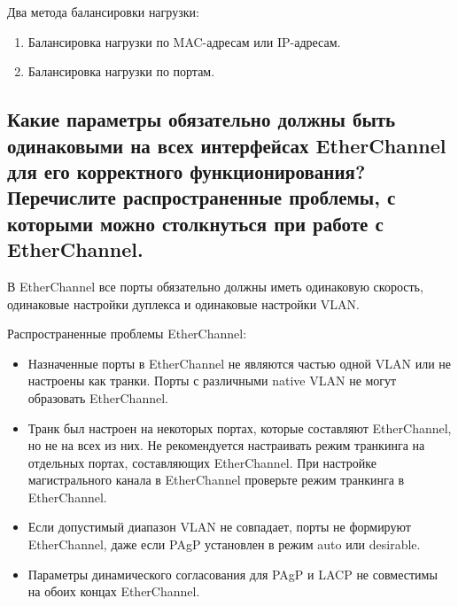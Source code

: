 Два метода балансировки нагрузки:

\begin{enumerate}
    \item Балансировка нагрузки по MAC-адресам или IP-адресам.
    \item Балансировка нагрузки по портам.
\end{enumerate}

\subsection{Какие параметры обязательно должны быть одинаковыми на
всех интерфейсах EtherChannel для его корректного
функционирования? Перечислите распространенные проблемы,
    с которыми можно столкнуться при работе с EtherChannel.}

В EtherChannel все порты обязательно должны иметь одинаковую
скорость, одинаковые настройки дуплекса и одинаковые настройки VLAN.

Распространенные проблемы EtherChannel:

\begin{itemize}
    \item Назначенные порты в EtherChannel не являются частью одной
    VLAN или не настроены как транки. Порты с различными native
    VLAN не могут образовать EtherChannel.
    \item Транк был настроен на некоторых портах, которые составляют
    EtherChannel, но не на всех из них. Не рекомендуется настраивать
    режим транкинга на отдельных портах, составляющих EtherChannel.
    При настройке магистрального канала в EtherChannel проверьте
    режим транкинга в EtherChannel.
    \item Если допустимый диапазон VLAN не совпадает, порты не
    формируют EtherChannel, даже если PAgP установлен в режим auto
    или desirable.
    \item Параметры динамического согласования для PAgP и LACP не
    совместимы на обоих концах EtherChannel.
\end{itemize}
